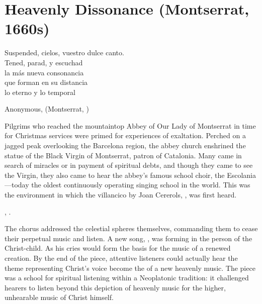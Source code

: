 
% 
% 
%

\chapter{Heavenly Dissonance (Montserrat, 1660s)}
\label{ch:cererols-suspended}

\epigraph
{Suspended, cielos, vuestro dulce canto. \\
Tened, parad, y escuchad \\
la más nueva consonancia \\
que forman en su distancia \\
lo eterno y lo temporal}
{Anonymous,  (Montserrat, )}

Pilgrims who reached the mountaintop Abbey of Our Lady of Montserrat in time for
Christmas services were primed for experiences of exaltation.
Perched on a jagged peak overlooking the Barcelona region, the abbey church
enshrined the statue of the Black Virgin of Montserrat, patron of Catalonia.
Many came in search of miracles or in payment of spiritual debts, and though
they came to see the Virgin, they also came to hear the abbey's famous school
choir, the Escolania---today the oldest continuously operating singing school in
the world.%
    \Autocite
    [On Spanish Marian devotion and shrines, see][]
    {Christian:LocalReligion}
This was the environment in which the villancico by Joan Cererols,
, was first heard.%
\begin{Footnote}
    , 
    \autocites
    [35--36, 49--118]{Cashner:WLSCM32}
    [xxv, 221--236]{Cererols:MEM-VC}.
\end{Footnote}
The chorus addressed the celestial spheres themselves, commanding them to cease
their perpetual music and listen.  
A new song, , was forming in the person of the
Christ-child. 
As  his cries would form the basis for the music of a
renewed creation.
By the end of the piece, attentive listeners could actually hear the theme
representing Christ's voice become the  of a new heavenly
music. 
The piece was a school for spiritual listening within a Neoplatonic tradition:
it challenged hearers to listen beyond this depiction of heavenly music for the
higher, unhearable music of Christ himself.


